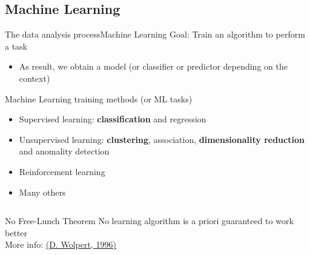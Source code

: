 \documentclass[10pt,compress]{beamer} %
\begin{document}
\subsection{Machine Learning}
\begin{frame}{The data analysis process}{Machine Learning}
	Goal: Train an algorithm to perform a task
		\begin{itemize}
		\item As result, we obtain a \alert{model} (or \alert{classifier} or \alert{predictor} depending on the context)
		\end{itemize}

	Machine Learning training methods (or ML tasks)
		\begin{itemize}
		\item Supervised learning: \textbf{classification} and regression
		\item Unsupervised learning: \textbf{clustering}, association, \textbf{dimensionality reduction} and anomality detection
        \item Reinforcement learning
		\item Many others
		\end{itemize}

	\vspace{-0.5cm}
	 \begin{flushright}
		\begin{columns}
		\begin{block}{No Free-Lunch Theorem}
		No learning algorithm is a priori guaranteed to work better\\
		More info: \href{http://citeseerx.ist.psu.edu/viewdoc/download?doi=10.1.1.390.9412&rep=rep1&type=pdf}{(D. Wolpert, 1996)}
		\end{block}
		\end{columns}
	 \end{flushright}

\end{frame}
\end{document}
